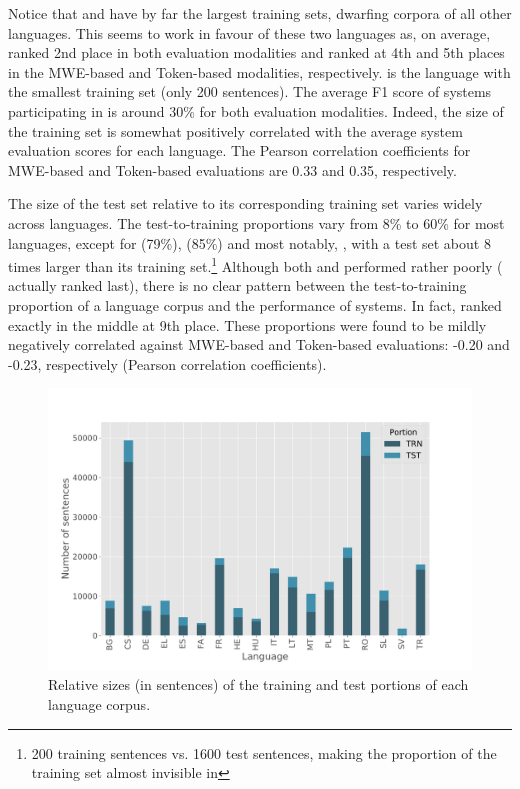 \documentclass[output=paper,modfonts,nonflat,draftmode]{langsci/langscibook}
\begin{document}
Notice that  and  have by far the largest training sets, dwarfing corpora of all other languages. This seems to work in favour of these two languages as, on average,  ranked 2nd place in both evaluation modalities and  ranked at 4th and 5th places in the MWE-based and Token-based modalities, respectively.  is the language with the smallest training set (only 200 sentences). The average F1 score of systems participating in  is around 30\% for both evaluation modalities. Indeed, the size of the training set is somewhat positively correlated with the average system evaluation scores for each language. The Pearson correlation coefficients for MWE-based and Token-based evaluations are 0.33 and 0.35, respectively.

The size of the test set relative to its corresponding training set varies widely across languages. The test-to-training proportions vary from 8\% to 60\% for most languages, except for  (79\%),  (85\%) and most notably, , with a test set about 8 times larger than its training set.\footnote{200 training sentences vs. 1600 test sentences, making the proportion of the training set almost invisible in } Although both  and  performed rather poorly ( actually ranked last), there is no clear pattern between the test-to-training proportion of a language corpus and the performance of systems. In fact,  ranked exactly in the middle at 9th place. These proportions were found to be mildly negatively correlated against MWE-based and Token-based evaluations: -0.20 and -0.23, respectively (Pearson correlation coefficients).

\begin{figure}
\includegraphics[height=.4\textheight]{figures/langcorpora-sizes-sents.pdf}
\caption{\label{fig:langcorp-sizes} Relative sizes (in sentences) of the training and test portions of each language corpus.}
\end{figure}
\end{document}
